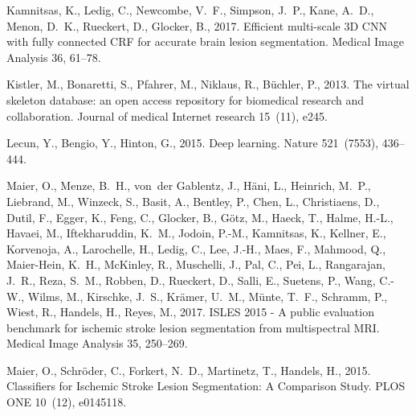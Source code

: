 \documentclass[letterpaper,final,authoryear,3p,times,twocolumn]{elsarticle}
\begin{document}
\begin{thebibliography}{36}
Kamnitsas, K., Ledig, C., Newcombe, V.~F., Simpson, J.~P., Kane, A.~D., Menon,
  D.~K., Rueckert, D., Glocker, B., 2017. {Efficient multi-scale 3D CNN with
  fully connected CRF for accurate brain lesion segmentation}. Medical Image
  Analysis 36, 61--78.

Kistler, M., Bonaretti, S., Pfahrer, M., Niklaus, R., B{\"{u}}chler, P., 2013.
  {The virtual skeleton database: an open access repository for biomedical
  research and collaboration.} Journal of medical Internet research 15~(11),
  e245.

Lecun, Y., Bengio, Y., Hinton, G., 2015. {Deep learning}. Nature 521~(7553),
  436--444.

Maier, O., Menze, B.~H., von~der Gablentz, J., H{\"{a}}ni, L., Heinrich, M.~P.,
  Liebrand, M., Winzeck, S., Basit, A., Bentley, P., Chen, L., Christiaens, D.,
  Dutil, F., Egger, K., Feng, C., Glocker, B., G{\"{o}}tz, M., Haeck, T.,
  Halme, H.-L., Havaei, M., Iftekharuddin, K.~M., Jodoin, P.-M., Kamnitsas, K.,
  Kellner, E., Korvenoja, A., Larochelle, H., Ledig, C., Lee, J.-H., Maes, F.,
  Mahmood, Q., Maier-Hein, K.~H., McKinley, R., Muschelli, J., Pal, C., Pei,
  L., Rangarajan, J.~R., Reza, S.~M., Robben, D., Rueckert, D., Salli, E.,
  Suetens, P., Wang, C.-W., Wilms, M., Kirschke, J.~S., Kr{\"{a}}mer, U.~M.,
  M{\"{u}}nte, T.~F., Schramm, P., Wiest, R., Handels, H., Reyes, M., 2017.
  {ISLES 2015 - A public evaluation benchmark for ischemic stroke lesion
  segmentation from multispectral MRI}. Medical Image Analysis 35, 250--269.

Maier, O., Schr{\"{o}}der, C., Forkert, N.~D., Martinetz, T., Handels, H.,
  2015{}. {Classifiers for Ischemic Stroke Lesion Segmentation: A
  Comparison Study}. PLOS ONE 10~(12), e0145118.


\end{thebibliography}
\end{document}
